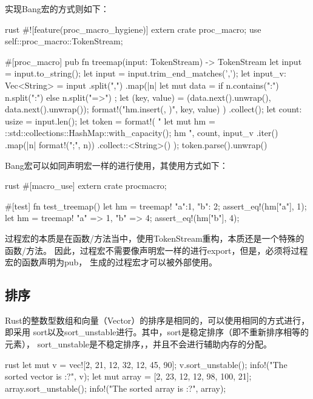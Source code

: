 实现Bang宏的方式则如下：
\begin{code-block}{rust}
#![feature(proc_macro_hygiene)]
extern crate proc_macro;
use self::proc_macro::TokenStream;

#[proc_macro]
pub fn treemap(input: TokenStream) -> TokenStream {
    let input = input.to_string();
    let input = input.trim_end_matches(',');
    let input_v: Vec<String> = input
        .split(",")
        .map(|n| {
            let mut data = if n.contains(":") {
                n.split(":")
            } else {
                n.split("=>")
            };
            let (key, value) = (data.next().unwrap(), data.next().unwrap());
            format!("hm.insert({}, {})", key, value)
        })
        .collect();
    let count: usize = input.len();
    let token = format!(
        "{{
        let mut hm = ::std::collections::HashMap::with_capacity({});
        {}
        hm
    }}",
        count,
        input_v
            .iter()
            .map(|n| format!("{};", n))
            .collect::<String>()
    );
    token.parse().unwrap()
}
\end{code-block}

Bang宏可以如同声明宏一样的进行使用，其使用方式如下：
\begin{code-block}{rust}
#[macro_use]
extern crate procmacro;

#[test]
fn test_treemap() {
    let hm = treemap! {"a":1, "b": 2};
    assert_eq!(hm["a"], 1);
    let hm = treemap! {"a" => 1, "b" => 4};
    assert_eq!(hm["b"], 4);
}
\end{code-block}

过程宏的本质是在函数/方法当中，使用TokenStream重构，本质还是一个特殊的函数/方法。
因此，过程宏不需要像声明宏一样的进行export，但是，必须将过程宏的函数声明为pub，
生成的过程宏才可以被外部使用。

\subsection{排序}
Rust的整数型数组和向量（Vector）的排序是相同的，可以使用相同的方式进行，即采用
sort以及sort\_unstable进行。其中，sort是稳定排序（即不重新排序相等的元素），
sort\_unstable是不稳定排序，，并且不会进行辅助内存的分配。
\begin{code-block}{rust}
let mut v = vec![2, 21, 12, 32, 12, 45, 90];
v.sort_unstable();
info!("The sorted vector is {:?}", v);
let mut array = [2, 23, 12, 12, 98, 100, 21];
array.sort_unstable();
info!("The sorted array is {:?}", array);
\end{code-block}

